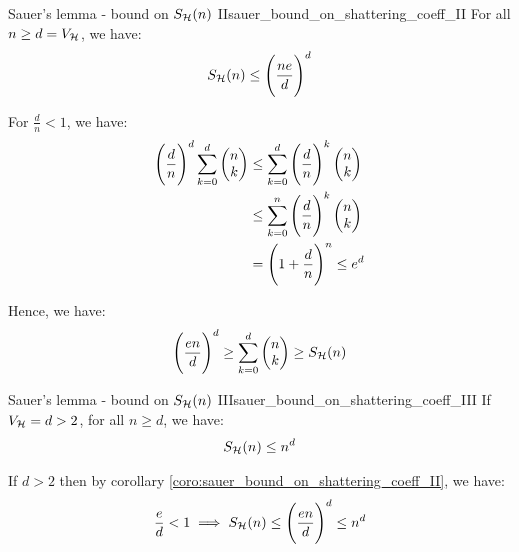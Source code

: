 \begin{corollary}{Sauer's lemma - bound on $S_{\mathcal{H}}(n)$ II}{sauer_bound_on_shattering_coeff_II}
    For all $n\ge d=V_{\mathcal{H}}$, we have:
    \begin{align*}
        S_{\mathcal{H}}(n) \le \Bigg( 
            \frac{ne}{d}
         \Bigg)^d
    \end{align*}
\end{corollary}

\begin{proof*}
    For $\frac{d}{n} < 1$, we have:
    \begin{align*}
        \Bigg( \frac{d}{n} \Bigg)^d \sum_{k=0}^d \begin{pmatrix}
            n \\ k
        \end{pmatrix} &\le \sum_{k=0}^d \Bigg( \frac{d}{n} \Bigg)^k \begin{pmatrix}
            n \\ k
        \end{pmatrix} \\
        &\le \sum_{k=0}^n \Bigg( \frac{d}{n} \Bigg)^k \begin{pmatrix}
            n \\ k 
        \end{pmatrix} \\
        &= \Bigg( 1 + \frac{d}{n} \Bigg)^n \le e^d
    \end{align*}

    \noindent Hence, we have:
    \begin{align*}
        \Bigg( \frac{en}{d} \Bigg)^d \ge \sum_{k=0}^d \begin{pmatrix}
            n \\ k
        \end{pmatrix} \ge S_{\mathcal{H}}(n)
    \end{align*}
\end{proof*}

\begin{corollary}{Sauer's lemma - bound on $S_{\mathcal{H}}(n)$ III}{sauer_bound_on_shattering_coeff_III}
    If $V_{\mathcal{H}}=d>2$, for all $n\ge d$, we have:
    \begin{align*}
        S_{\mathcal{H}}(n) \le n^d
    \end{align*}
\end{corollary}

\begin{proof*}
    If $d>2$ then by corollary \ref{coro:sauer_bound_on_shattering_coeff_II}, we have:
    \begin{align*}
        \frac{e}{d} < 1 \implies S_{\mathcal{H}}(n) \le \Bigg( \frac{en}{d} \Bigg)^d \le n^d
    \end{align*}
\end{proof*}


